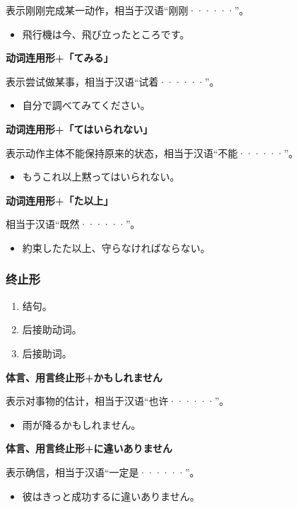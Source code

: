 表示刚刚完成某一动作，相当于汉语``刚刚······''。
\begin{itemize}
  \item 飛行機は今、飛び立ったところです。
\end{itemize}

{\bf
\noindent 动词连用形+「てみる」
}

表示尝试做某事，相当于汉语``试着······''。
\begin{itemize}
  \item 自分で調べてみてください。
\end{itemize}

{\bf
\noindent 动词连用形+「てはいられない」
}

表示动作主体不能保持原来的状态，相当于汉语``不能······''。
\begin{itemize}
  \item もうこれ以上黙ってはいられない。
\end{itemize}

{\bf
\noindent 动词连用形+「た以上」
}

相当于汉语``既然······''。
\begin{itemize}
  \item 約束したた以上、守らなければならない。
\end{itemize}


\subsubsection{终止形}%

\begin{enumerate}
  \item 结句。
  \item 后接助动词。
  \item 后接助词。
\end{enumerate}

{\bf
\noindent 体言、用言终止形+かもしれません
}

表示对事物的估计，相当于汉语``也许······''。
\begin{itemize}
  \item 雨が降るかもしれません。
\end{itemize}

{\bf
\noindent 体言、用言终止形+に違いありません
}

表示确信，相当于汉语``一定是······''。
\begin{itemize}
  \item 彼はきっと成功するに違いありません。
\end{itemize}

